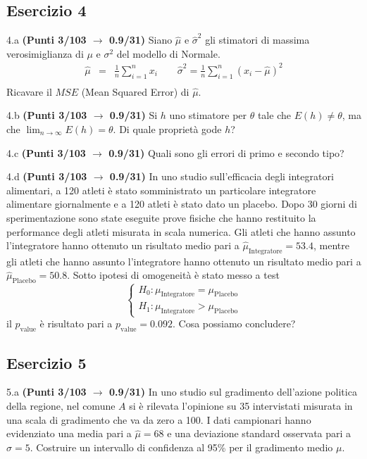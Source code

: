 \documentclass[
  11pt,
]{book}
\theoremstyle{mytheoremstyle}
\theoremstyle{mydefstyle}
\begin{document}
\subsection{Esercizio 4}\label{esercizio-4-20}

4.a \textbf{(Punti 3/103 \(\rightarrow\) 0.9/31)} Siano \(\hat \mu\) e \(\hat\sigma^2\) gli stimatori di massima verosimiglianza di \(\mu\) e \(\sigma^2\) del modello di Normale.
\begin{eqnarray*}
  \hat\mu &=&  \frac 1n\sum_{i=1}^nx_i \qquad \hat\sigma^2 =  \frac 1n\sum_{i=1}^n(x_i-\hat\mu)^2\\
\end{eqnarray*}
Ricavare il \(MSE\) (Mean Squared Error) di \(\hat\mu\).

4.b \textbf{(Punti 3/103 \(\rightarrow\) 0.9/31)} Si \(h\) uno stimatore per \(\theta\) tale che \(E(h)\ne\theta\), ma che \(\lim_{n\to\infty}E(h)=\theta\). Di quale proprietà gode \(h\)?

4.c \textbf{(Punti 3/103 \(\rightarrow\) 0.9/31)} Quali sono gli errori di primo e secondo tipo?

4.d \textbf{(Punti 3/103 \(\rightarrow\) 0.9/31)} In uno studio sull'efficacia degli integratori alimentari, a 120 atleti è stato somministrato un particolare integratore alimentare giornalmente e a 120 atleti è stato dato un placebo. Dopo 30 giorni di sperimentazione sono state eseguite prove fisiche che hanno restituito la performance degli atleti misurata in scala numerica. Gli atleti che hanno assunto l'integratore hanno ottenuto un risultato medio pari a \(\hat\mu_\text{Integratore}=53.4\), mentre gli atleti che hanno assunto l'integratore hanno ottenuto un risultato medio pari a \(\hat\mu_\text{Placebo}=50.8\).
Sotto ipotesi di omogeneità è stato messo a test
\[
\begin{cases}
H_0:\mu_\text{Integratore}=\mu_\text{Placebo}\\
H_1:\mu_\text{Integratore}>\mu_\text{Placebo}
\end{cases}
\]
il \(p_\text{value}\) è risultato pari a \(p_\text{value}=0.092\). Cosa possiamo concludere?

\subsection{Esercizio 5}\label{esercizio-5-19}

5.a \textbf{(Punti 3/103 \(\rightarrow\) 0.9/31)} In uno studio sul gradimento dell'azione politica della regione, nel comune \(A\) si è rilevata l'opinione su 35 intervistati misurata in una scala di gradimento che va da zero a 100. I dati campionari hanno evidenziato una media pari a \(\hat\mu=68\) e una deviazione standard osservata pari a \(\hat\sigma=5\).
Costruire un intervallo di confidenza al 95\% per il gradimento medio \(\mu\).
\end{document}
